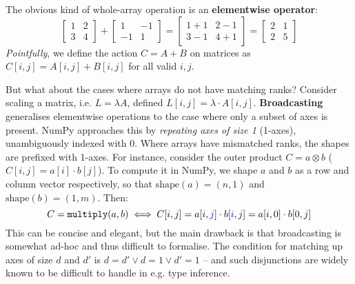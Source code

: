 The obvious kind of whole-array operation is an \textbf{elementwise operator}:
$$ \begin{bmatrix} 1 & 2 \\ 3 & 4 \end{bmatrix} 
+ \begin{bmatrix}1 & -1 \\ -1 & 1 \end{bmatrix}
= \begin{bmatrix}1 + 1 & 2 - 1 \\ 3 - 1 & 4 + 1 \end{bmatrix}
= \begin{bmatrix}2 & 1 \\ 2 & 5 \end{bmatrix} $$
\textit{Pointfully}, we define the action $C = A + B$ on matrices as $C[i, j] = A[i, j] + B[i, j]$ for all valid $i, j$. 

But what about the cases where arrays do not have matching ranks? Consider scaling a matrix, i.e. $L = \lambda A$, defined $L[i, j] = \lambda \cdot A[i, j]$. \textbf{Broadcasting} generalises elementwise operations to the case where only a subset of axes is present. NumPy approaches this by \textit{repeating axes of size 1} (1-axes), unambiguously indexed with 0. 
Where arrays have mismatched ranks, the shapes are prefixed with 1-axes.
For instance, consider the outer product $C = a \otimes b$ ($C[i, j] = a[i] \cdot b[j] $). To compute it in NumPy, we shape $a$ and $b$ as a row and column vector respectively, so that $\mathrm{shape}(a) = (n, 1)$ and $\mathrm{shape}(b) = (1, m)$. Then:
$$ C = \texttt{multiply}(a, b) \iff C[i, j] = a[i, {\color{blue} j}] \cdot b[{\color{blue} i}, j] = a[i, 0] \cdot b[0, j] $$
This can be concise and elegant, but the main drawback is that broadcasting is somewhat ad-hoc and thus difficult to formalise. The condition for matching up axes of size $d$ and $d'$ is $d = d' \lor d = 1 \lor d' = 1 $ -- and such disjunctions are widely known to be difficult to handle in e.g. type inference.

